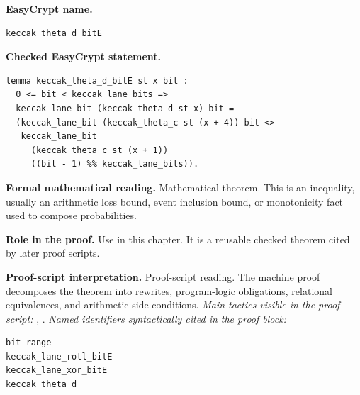 \begin{formaltheorem}
\noindent\textbf{EasyCrypt name.}
\begin{lstlisting}[language=EasyCrypt,basicstyle=\ttfamily\scriptsize]
keccak_theta_d_bitE
\end{lstlisting}
\noindent\textbf{Checked EasyCrypt statement.}
\begin{lstlisting}[language=EasyCrypt,basicstyle=\ttfamily\scriptsize]
lemma keccak_theta_d_bitE st x bit :
  0 <= bit < keccak_lane_bits =>
  keccak_lane_bit (keccak_theta_d st x) bit =
  (keccak_lane_bit (keccak_theta_c st (x + 4)) bit <>
   keccak_lane_bit
     (keccak_theta_c st (x + 1))
     ((bit - 1) %% keccak_lane_bits)).
\end{lstlisting}
\noindent\textbf{Formal mathematical reading.}
Mathematical theorem. This is an inequality, usually an arithmetic loss bound, event inclusion bound, or monotonicity fact used to compose probabilities.

\noindent\textbf{Role in the proof.}
Use in this chapter. It is a reusable checked theorem cited by later proof scripts.

\noindent\textbf{Proof-script interpretation.}
Proof-script reading. The machine proof decomposes the theorem into rewrites, program-logic obligations, relational equivalences, and arithmetic side conditions.
\emph{Main tactics visible in the proof script:} , .
\emph{Named identifiers syntactically cited in the proof block:}
\begin{lstlisting}[language=EasyCrypt,basicstyle=\ttfamily\scriptsize]
bit_range
keccak_lane_rotl_bitE
keccak_lane_xor_bitE
keccak_theta_d
\end{lstlisting}

\end{formaltheorem}

